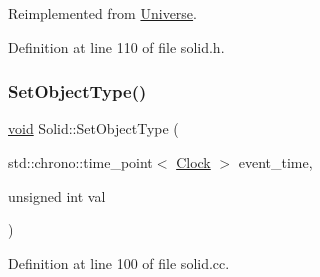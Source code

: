 Reimplemented from \mbox{\hyperlink{class_universe_ae0cb8d86b2fbb8396d605160344b42f5}{Universe}}.



Definition at line 110 of file solid.\+h.

\mbox{\label{class_solid_af6fe46af0be9a9533e114b1c0f186bfc}} 
\subsubsection{\texorpdfstring{Set\+Object\+Type()}{SetObjectType()}}
{\footnotesize\ttfamily \mbox{\hyperlink{glad_8h_a950fc91edb4504f62f1c577bf4727c29}{void}} Solid\+::\+Set\+Object\+Type (\begin{DoxyParamCaption}\item[{std\+::chrono\+::time\+\_\+point$<$ \mbox{\hyperlink{universe_8h_a0ef8d951d1ca5ab3cfaf7ab4c7a6fd80}{Clock}} $>$}]{event\+\_\+time,  }\item[{unsigned int}]{val }\end{DoxyParamCaption})}



Definition at line 100 of file solid.\+cc.

